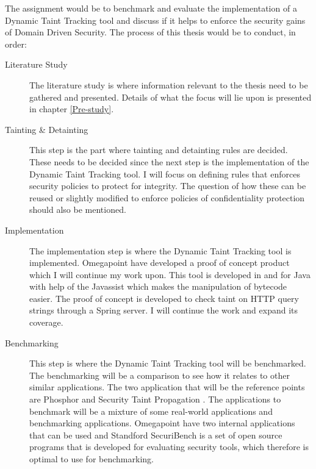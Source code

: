 \documentclass{../kththesis}
\begin{document}
	\noindent
	The assignment would be to benchmark and evaluate the implementation of a Dynamic Taint Tracking tool and discuss if it helps to enforce the security gains of Domain Driven Security. The process of this thesis would be to conduct, in order:
	
	\begin{description}  
		\item [Literature Study]
		The literature study is where information relevant to the thesis need to be gathered and presented. Details of what the focus will lie upon is presented in chapter \ref{Pre-study}.
	
		\item [Tainting \& Detainting]
		This step is the part where tainting and detainting rules are decided. These needs to be decided since the next step is the implementation of the Dynamic Taint Tracking tool. I will focus on defining rules that enforces security policies to protect for integrity. The question of how these can be reused or slightly modified to enforce policies of confidentiality protection should also be mentioned.
	
		\item [Implementation]
		The implementation step is where the Dynamic Taint Tracking tool is implemented. Omegapoint have developed a proof of concept product which I will continue my work upon. This tool is developed in and for Java with help of the Javassist \parencite{Javassist} which makes the manipulation of bytecode easier. The proof of concept is developed to check taint on HTTP query strings through a Spring server. I will continue the work and expand its coverage.
	
	
		\item [Benchmarking]
		This step is where the Dynamic Taint Tracking tool will be benchmarked. The benchmarking will be a comparison to see how it relates to other similar applications. The two application that will be the reference points are Phosphor \parencite{phosphor} and Security Taint Propagation \parencite{securityTaint}. The applications to benchmark will be a mixture of some real-world applications and benchmarking applications. Omegapoint have two internal applications that can be used and Standford SecuriBench \parencite{securiBench} is a set of open source programs that is developed for evaluating security tools, which therefore is optimal to use for benchmarking.
		

\end{description}
\end{document}
